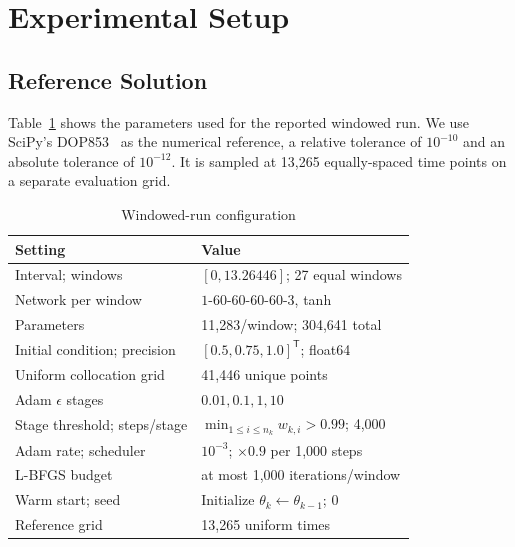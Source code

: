 \documentclass[conference,a4paper]{IEEEtran}
\begin{document}


\section{Experimental Setup}



\subsection{Reference Solution}


Table~\ref{tab:config} shows the parameters used for the reported windowed run. We use SciPy’s DOP853~\cite{virtanen2020} as the numerical reference, a relative tolerance of $10^{-10}$ and an absolute tolerance of $10^{-12}$. It is sampled at 13,265 equally-spaced time points on a separate evaluation grid.

\begin{table}[t]
\caption{Windowed-run configuration}
\label{tab:config}
\centering\footnotesize
\begin{tabular}{ll}
\toprule
Setting & Value\\
\midrule
Interval; windows & $[0,13.26446]$; 27 equal windows\\
Network per window & $1$-$60$-$60$-$60$-$60$-$3$, tanh\\
Parameters & 11,283/window; 304,641 total\\
Initial condition; precision & $[0.5,0.75,1.0]^\mathsf{T}$; float64\\
Uniform collocation grid & 41,446 unique points\\
Adam $\epsilon$ stages & $0.01,0.1,1,10$\\
Stage threshold; steps/stage & $\min_{1\leq i\leq n_k}w_{k,i}>0.99$; 4,000\\
Adam rate; scheduler & $10^{-3}$; $\times0.9$ per 1,000 steps\\
L-BFGS budget & at most 1,000 iterations/window\\
Warm start; seed & Initialize $\theta_k\gets\theta_{k-1}$; 0\\
Reference grid & 13,265 uniform times\\
\bottomrule
\end{tabular}
\end{table}
\end{document}

